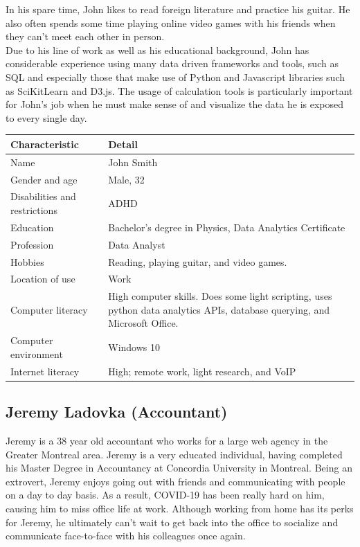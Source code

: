 \documentclass[11pt,onside]{report}
\begin{document}
In his spare time, John likes to read foreign literature and practice his guitar. He also often spends some time playing online video games with his friends when they can’t meet each other in person.  \\

Due to his line of work as well as his educational background, John has considerable experience using many data driven frameworks and tools, such as SQL and especially those that make use of Python and Javascript libraries such as SciKitLearn and D3.js. The usage of calculation tools is particularly important for John’s job when he must make sense of and visualize the data he is exposed to every single day.
\begin{center}
    \begin{tabular}{|p{4cm}|p{10cm}|}
        \hline
        \bf{Characteristic} & \bf{Detail} \\
        \hline
        Name &   John Smith \\
        \hline
        Gender and age & Male, 32 \\
        \hline
        Disabilities and restrictions & ADHD \\
        \hline
        Education & Bachelor’s degree in Physics, Data Analytics Certificate \\
        \hline
        Profession & Data Analyst \\
        \hline
        Hobbies & Reading, playing guitar, and video games. \\
        \hline
        Location of use & Work \\
        \hline
        Computer literacy & High computer skills. Does some light scripting, uses python data analytics APIs, database querying, and Microsoft Office. \\
        \hline
        Computer environment &  Windows 10 \\
        \hline
        Internet literacy &  High; remote work, light research, and VoIP \\
        \hline
    \end{tabular}
\end{center}

\subsection{Jeremy Ladovka (Accountant)}
Jeremy is a 38 year old accountant who works for a large web agency in the Greater Montreal area. Jeremy is a very educated individual, having completed his Master Degree in Accountancy at Concordia University in Montreal. Being an extrovert, Jeremy enjoys going out with friends and communicating with people on a day to day basis. As a result, COVID-19 has been really hard on him, causing him to miss office life at work. Although working from home has its perks for Jeremy, he ultimately can’t wait to get back into the office to socialize and communicate face-to-face with his colleagues once again. \\
\end{document}
